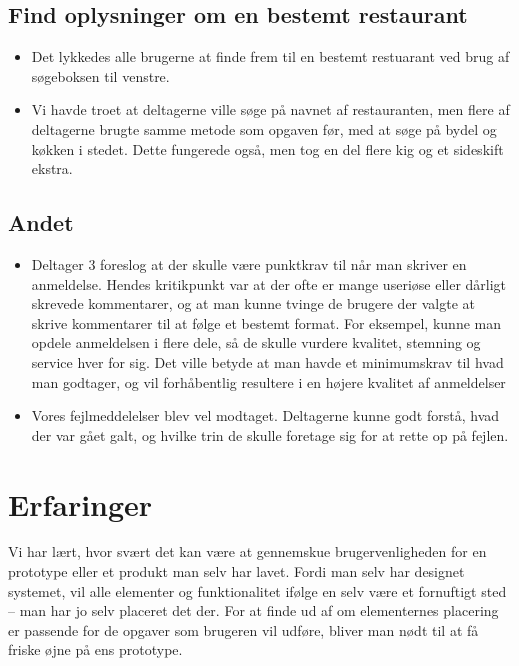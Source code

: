\documentclass[a4paper, 12pt]{article}
\newcommand\pic[1]{\texttt{[image: ../oevelse6/Pics/\#1]}}
\newcommand\goodidea{\pic{goodidea}}
\newcommand\good{\pic{good}}
\newcommand\smallprob{\pic{smallproblem}}
\begin{document}
\subsection{Find oplysninger om en bestemt restaurant}
\begin{itemize}
\item[\good] Det lykkedes alle brugerne at finde frem til en bestemt restuarant ved brug af søgeboksen til venstre.
\item[\smallprob] Vi havde troet at deltagerne ville søge på navnet af restauranten, men flere af deltagerne brugte samme metode som opgaven før, med at søge på bydel og køkken i stedet. Dette fungerede også, men tog en del flere kig og et sideskift ekstra.
\end{itemize}

\subsection{Andet}
\begin{itemize}
  \item[\goodidea] Deltager 3 foreslog at der skulle være punktkrav til når man skriver en anmeldelse. Hendes kritikpunkt var at der ofte er mange useriøse eller dårligt skrevede kommentarer, og at man kunne tvinge de brugere der valgte at skrive kommentarer til at følge et bestemt format. For eksempel, kunne man opdele anmeldelsen i flere dele, så de skulle vurdere kvalitet, stemning og service hver for sig. Det ville betyde at man havde et minimumskrav til hvad man godtager, og vil forhåbentlig resultere i en højere kvalitet af anmeldelser

  \item[\good] Vores fejlmeddelelser blev vel modtaget. Deltagerne kunne godt forstå, hvad der var gået galt, og hvilke trin de skulle foretage sig for at rette op på fejlen.
\end{itemize}


\section{Erfaringer}
\label{sec:Erfaringer}

Vi har lært, hvor svært det kan være at gennemskue brugervenligheden for en prototype eller et produkt man selv har lavet. Fordi man selv har designet systemet, vil alle elementer og funktionalitet ifølge en selv være et fornuftigt sted -- man har jo selv placeret det der. For at finde ud af om elementernes placering er passende for de opgaver som brugeren vil udføre, bliver man nødt til at få friske øjne på ens prototype. 
\end{document}
